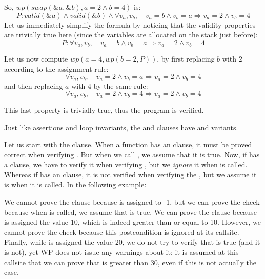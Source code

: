 So, $wp(swap(\&a, \&b), a = 2 \wedge b = 4)$ is:
$$P: valid(\&a) \wedge valid(\&b) \wedge \forall v_a, v_b, \quad v_a = b \wedge v_b = a \Rightarrow v_a = 2 \wedge v_b = 4$$
Let us immediately simplify the formula by noticing that the validity properties
are trivially true here (since the variables are allocated on the stack just
before):
$$P: \forall v_a, v_b, \quad v_a = b \wedge v_b = a \Rightarrow v_a = 2 \wedge v_b = 4$$


Let us now compute $wp(a = 4, wp(b = 2, P))$, by first replacing $b$ with
$2$ according to the assignment rule:
$$\forall v_a, v_b, \quad v_a = 2 \wedge v_b = a \Rightarrow v_a = 2 \wedge v_b = 4$$
and then replacing $a$ with $4$ by the same rule:
$$\forall v_a, v_b, \quad v_a = 2 \wedge v_b = 4 \Rightarrow v_a = 2 \wedge v_b = 4$$


This last property is trivially true, thus the program is verified.




Just like assertions and loop invariants, the  and
 clauses have 
and  variants.


Let us start with the  clause. When a function
 has an  clause, it must be proved correct
when verifying . But when we call , we
assume that it is true. Now, if  has a 
clause, we have to verify it when verifying , but we
\textit{ignore} it when  is called. Whereas if
 has an  clause, it is not verified when
verifying the , but we assume it is when it is called. In the
following example:



We cannot prove the clause  because  is assigned
to -1, but we can prove the check  because when  is
called, we assume that  is true. We can prove the clause
 because  is assigned the value 10, which is indeed greater
than or equal to 10. However, we cannot prove the check  because
this postcondition is ignored at its callsite. Finally, while  is
assigned the value 20, we do not try to verify that  is true (and it is
not), yet WP does not issue any warnings about it: it is assumed at
this callsite that we can
prove that  is greater than 30, even if this is not
actually the case.

